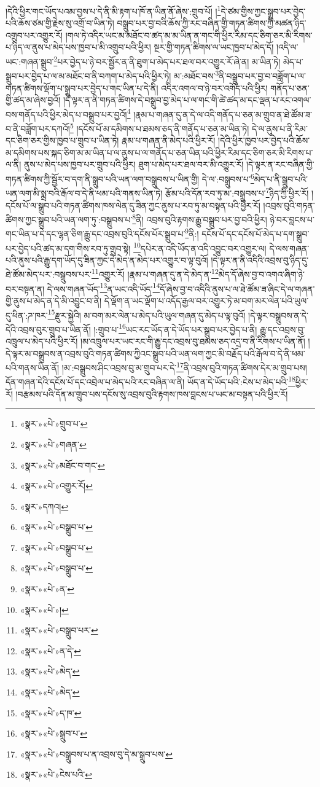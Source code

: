 །དེའི་ཕྱིར་གང་ཡོད་པའམ་བྱས་པ་དེ་ནི་མི་རྟག་པ་ཁོ་ན་ཡིན་ནོ་ཞེས་:གྲུབ་པོ། །\footnote{«སྣར་»«པེ་»གྲུབ་པ་}དེ་ཙམ་གྱིས་ཀྱང་སྒྲུབ་པར་བྱེད་པའི་ཆོས་ཙམ་གྱི་རྗེས་སུ་འགྲོ་བ་ཡིན་ཏེ། བསྒྲུབ་པར་བྱ་བའི་ཆོས་ཀྱི་རང་བཞིན་གྱི་གཏན་ཚིགས་ཀྱི་མཚན་ཉིད་འགྲུབ་པར་འགྱུར་རོ། །གལ་ཏེ་འདིར་ཡང་མ་མཐོང་བ་ཚད་མ་མ་ཡིན་ན་གང་གི་ཕྱིར་རིམ་དང་ཅིག་ཅར་མི་རིགས་པ་ཉིད་ལ་ནུས་པ་མེད་པས་ཁྱབ་པ་མི་འགྲུབ་པའི་ཕྱིར། སྔར་གྱི་གཏན་ཚིགས་ལ་ཡང་ཁྱབ་པ་མེད་དོ། །འདི་ལ་ཡང་:གཞན་སྒྲུབ་\footnote{«སྣར་»«པེ་»གཞན་}པར་བྱེད་པ་ཉེ་བར་སྦྱོར་ན་ནི་ཐུག་པ་མེད་པར་ཐལ་བར་འགྱུར་རོ་ཞེ་ན། མ་ཡིན་ཏེ། མེད་པ་སྒྲུབ་པར་བྱེད་པ་ལ་མ་མཐོང་བ་ནི་བཀག་པ་མེད་པའི་ཕྱིར་ཏེ། མ་:མཐོང་བས་\footnote{«སྣར་»«པེ་»མཐོང་བ་གང་}ནི་བསྒྲུབ་པར་བྱ་བ་བཟློག་པ་ལ་གཏན་ཚིགས་ལྡོག་པ་སྒྲུབ་པར་བྱེད་པ་གང་ཡིན་པ་དེ་ནི། འདིར་འགལ་བ་ཉེ་བར་འགོད་པའི་ཕྱིར། གནོད་པ་ཅན་གྱི་ཚད་མ་ཞེས་བྱའོ། །དེ་ལྟར་ན་ནི་གཏན་ཚིགས་དེ་བསྒྲུབ་བྱ་མེད་པ་ལ་གང་གི་ཚེ་ཚད་མ་དང་ལྡན་པ་རང་འགལ་བས་གནོད་པའི་ཕྱིར་མེད་པ་བསྒྲུབ་པར་བྱའོ།\footnote{«སྣར་»«པེ་»འགྱུར་རོ།} །རྣམ་པ་གཞན་དུ་ན་དེ་ལ་འདི་གནོད་པ་ཅན་མ་གྲུབ་ན་ཐེ་ཚོམ་ཟ་བ་ནི་བཟློག་པར་དཀའོ།\footnote{«སྣར་»དཀའ།} །དངོས་པོ་མ་དམིགས་པ་ཐམས་ཅད་ནི་གནོད་པ་ཅན་མ་ཡིན་ཏེ། དེ་ལ་ནུས་པ་ནི་རིམ་དང་ཅིག་ཅར་གྱིས་ཁྱབ་པ་གྲུབ་པ་ཡིན་ཏེ། རྣམ་པ་གཞན་ནི་མེད་པའི་ཕྱིར་རོ། །དེའི་ཕྱིར་ཁྱབ་པར་བྱེད་པའི་ཆོས་མ་དམིགས་པས་སྐད་ཅིག་མ་མ་ཡིན་པ་ལ་ནུས་པ་ལ་གནོད་པ་ཅན་ཡིན་པའི་ཕྱིར་རིམ་དང་ཅིག་ཅར་མི་རིགས་པ་ལ་ནི། ནུས་པ་མེད་པས་ཁྱབ་པར་གྲུབ་པའི་ཕྱིར། ཐུག་པ་མེད་པར་ཐལ་བར་མི་འགྱུར་རོ། །དེ་ལྟར་ན་རང་བཞིན་གྱི་གཏན་ཚིགས་ཀྱི་སྦྱོར་བ་དག་ནི་སྒྲུབ་པའི་ཡན་ལག་བསྒྲུབས་པ་ཡིན་གྱི། དེ་ལ་:བསྒྲུབས་པ་\footnote{«སྣར་»«པེ་»བསྒྲུབ་པ་}མེད་པ་ནི་སྒྲུབ་པའི་ཡན་ལག་མི་སྨྲ་བའི་རྒོལ་བ་དེ་ནི་ཕམ་པའི་གནས་ཡིན་ཏེ། རྩོམ་པའི་དོན་རབ་ཏུ་མ་:བསྒྲུབས་པ་\footnote{«སྣར་»«པེ་»བསྒྲུབ་པ་}ཉིད་ཀྱི་ཕྱིར་རོ། །དངོས་པོ་ལ་སྒྲུབ་པའི་གཏན་ཚིགས་ཁས་ལེན་དུ་ཟིན་ཀྱང་ནུས་པ་རབ་ཏུ་མ་བསྟན་པའི་ཕྱིར་རོ། །འབྲས་བུའི་གཏན་ཚིགས་ཀྱང་སྒྲུབ་པའི་ཡན་ལག་ཏུ་:བསྒྲུབས་པ་\footnote{«སྣར་»«པེ་»བསྒྲུབ་པ་}ནི། འབྲས་བུའི་རྟགས་རྒྱུ་བསྒྲུབ་པར་བྱ་བའི་ཕྱིར། ཉེ་བར་བླངས་པ་གང་ཡིན་པ་དེ་དང་ལྷན་ཅིག་རྒྱུ་དང་འབྲས་བུའི་དངོས་པོར་སྒྲུབ་པ་\footnote{«སྣར་»«པེ་»ན་}ནི:། དངོས་པོ་དང་དངོས་པོ་མེད་པ་དག་སྒྲུབ་པར་བྱེད་པའི་ཚད་མ་དག་གིས་རབ་ཏུ་གྲུབ་སྟེ། \footnote{«སྣར་»«པེ་»།  }དཔེར་ན་འདི་ཡོད་ན་འདི་འབྱུང་བར་འགྱུར་ལ། དེ་ལས་གཞན་པའི་ནུས་པའི་རྒྱུ་དག་ཡོད་དུ་ཟིན་ཀྱང་དེ་མེད་ན་མེད་པར་འགྱུར་བ་ལྟ་བུའོ། །དེ་ལྟར་ན་ནི་འདིའི་འབྲས་བུ་ཉིད་དུ་ཐེ་ཚོམ་མེད་པར་:བསྒྲུབས་པར་\footnote{«སྣར་»«པེ་»བསྒྲུབ་པར་}འགྱུར་རོ། །རྣམ་པ་གཞན་དུ་ན་དེ་མེད་ན་\footnote{«སྣར་»«པེ་»ན་དེ་}མེད་དོ་ཞེས་བྱ་བ་འགའ་ཞིག་ཉེ་བར་བསྟན་ན། དེ་ལས་གཞན་ཡོད་\footnote{«སྣར་»«པེ་»མེད་}ན་ཡང་འདི་ཡོད་\footnote{«སྣར་»«པེ་»མེད་}དོ་ཞེས་བྱ་བ་འདིའི་ནུས་པ་ལ་ཐེ་ཚོམ་ཟ་ཞིང་དེ་ལ་གཞན་གྱི་ནུས་པ་མེད་ན་དེ་མི་འབྱུང་བ་ནི། དེ་ལྡོག་ན་ཡང་ལྡོག་པ་འདོད་རྒྱལ་བར་འགྱུར་ཏེ་མ་བག་མར་ལེན་པའི་ཡུལ་དུ་ཕིན་:ཌ་ཁར་\footnote{«སྣར་»«པེ་»ད་ཁ་}རྫུར་སྐྱེའི། མ་བག་མར་ལེན་པ་མེད་པའི་ཡུལ་གཞན་དུ་མེད་པ་ལྟ་བུའོ། །དེ་ལྟར་བསྒྲུབས་ན་དེ་དེའི་འབྲས་བུར་གྲུབ་པ་ཡིན་ནོ། །:གྲུབ་པ་\footnote{«སྣར་»«པེ་»སྒྲུབ་པ་}ཡང་རང་ཡོད་ན་དེ་ཡོད་པར་སྒྲུབ་པར་བྱེད་པ་ནི། རྒྱུ་དང་འབྲས་བུ་འཁྲུལ་པ་མེད་པའི་ཕྱིར་རོ། །མ་འཁྲུལ་པར་ཡང་རང་གི་རྒྱུ་དང་འབྲས་བུ་ཐམས་ཅད་འདྲ་བ་ནི་རིགས་པ་ཡིན་ནོ། །དེ་ལྟར་མ་བསྒྲུབས་ན་འབྲས་བུའི་གཏན་ཚིགས་ཀྱིའང་སྒྲུབ་པའི་ཡན་ལག་ཀྱང་མི་བརྗོད་པའི་རྒོལ་བ་དེ་ནི་ཕམ་པའི་གནས་ཡིན་ནོ། །མ་:བསྒྲུབས་ཤིང་འབྲས་བུ་མ་གྲུབ་པར་དེ་\footnote{«སྣར་»«པེ་»བསྒྲུབས་པ་ན་འབྲས་བུ་དེ་མ་སྒྲུབ་པས་}ནི་འབྲས་བུའི་གཏན་ཚིགས་དེར་མ་གྲུབ་པས། དོན་གཞན་དེའི་དངོས་པོ་དང་འབྲེལ་པ་མེད་པའི་རང་བཞིན་ལ་ནི། ཡོད་ན་དེ་ཡོད་པའི་:ངེས་པ་མེད་པའི་\footnote{«སྣར་»«པེ་»ངེས་པའི་}ཕྱིར་རོ། །བརྩམས་པའི་དོན་མ་གྲུབ་པས་དངོས་སུ་འབྲས་བུའི་རྟགས་ཁས་བླངས་པ་ཡང་མ་བསྟན་པའི་ཕྱིར་རོ། 